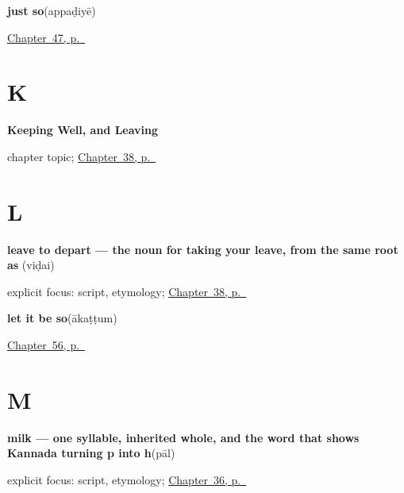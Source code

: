 \noindent\begin{minipage}[t]{\linewidth}
\raggedright
\textbf{just so}\enspace\emph{}\enspace(appaḍiyē)\par
\footnotesize \hyperref[ch:ta-replies]{Chapter~47, p.~\pageref*{ch:ta-replies}}
\end{minipage}\par\smallskip

\section*{K}

\noindent\begin{minipage}[t]{\linewidth}
\raggedright
\textbf{Keeping Well, and Leaving}\par
\footnotesize chapter topic; \hyperref[ch:ta-keeping-well-and-leaving]{Chapter~38, p.~\pageref*{ch:ta-keeping-well-and-leaving}}
\end{minipage}\par\smallskip

\section*{L}

\noindent\begin{minipage}[t]{\linewidth}
\raggedright
\textbf{leave to depart — the noun for taking your leave, from the same root as }\enspace\emph{}\enspace(viḍai)\par
\footnotesize explicit focus: script, etymology; \hyperref[ch:ta-keeping-well-and-leaving]{Chapter~38, p.~\pageref*{ch:ta-keeping-well-and-leaving}}
\end{minipage}\par\smallskip

\noindent\begin{minipage}[t]{\linewidth}
\raggedright
\textbf{let it be so}\enspace\emph{}\enspace(ākaṭṭum)\par
\footnotesize \hyperref[ch:ta-how-much]{Chapter~56, p.~\pageref*{ch:ta-how-much}}
\end{minipage}\par\smallskip

\section*{M}

\noindent\begin{minipage}[t]{\linewidth}
\raggedright
\textbf{milk — one syllable, inherited whole, and the word that shows Kannada turning p into h}\enspace\emph{}\enspace(pāl)\par
\footnotesize explicit focus: script, etymology; \hyperref[ch:ta-what-you-are-offered]{Chapter~36, p.~\pageref*{ch:ta-what-you-are-offered}}
\end{minipage}\par\smallskip


